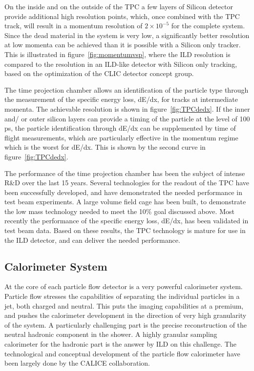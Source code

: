 \documentclass[%
 amsmath,amssymb,
 aps,
]{revtex4-1}
\begin{document}
On the inside and on the outside of the TPC a few layers of Silicon detector provide additional high resolution points, which, once combined with the TPC track, will result in a momentum resolution of $2 \times 10^{-5}$ for the complete system. Since the dead material in the system is very low, a significantly better resolution at low momenta can be achieved than it is possible with a Silicon only tracker. This is illustrated in figure~\ref{fig:momentumvsp}, where the ILD resolution is compared to the resolution in an ILD-like detector with Silicon only tracking, based on the optimization of the CLIC detector concept group. 

The time projection chamber allows an identification of the particle type through the measurement of the specific energy loss, dE/dx, for tracks at intermediate momenta. The achievable resolution is shown in figure~\ref{fig:TPCdedx}. If the inner and/ or outer silicon layers can provide a timing of the particle at the level of 100 ps, the particle identification through dE/dx can be supplemented by time of flight measurements, which are particularly effective in the momentum regime which is the worst for dE/dx. This is shown by the second curve in figure~\ref{fig:TPCdedx}. 

The performance of the time projection chamber has been the subject of intense R\&D over the last 15 years. Several technologies for the readout of the TPC have been successfully developed, and have demonstrated the needed performance in test beam experiments. A large volume field cage has been built, to demonstrate the low mass technology needed to meet the 10\% goal discussed above. Most recently the performance of the specific energy loss, dE/dx, has been validated in test beam data. Based on these results, the TPC technology is mature for use in the ILD detector, and can deliver the needed performance. 


\subsection{Calorimeter System}
At the core of each particle flow detector is a very powerful calorimeter system. Particle flow stresses the capabilities of separating the individual particles in a jet, both charged and neutral. This puts the imaging capabilities at a premium, and pushes the calorimeter development in the direction of very high granularity of the system. A particularly challenging part is the precise reconstruction of the neutral hadronic component in the shower. A highly granular sampling calorimeter for the hadronic part is the answer by ILD on this challenge. The technological and conceptual development of the particle flow calorimeter have been largely done by the CALICE collaboration. 
\end{document}
